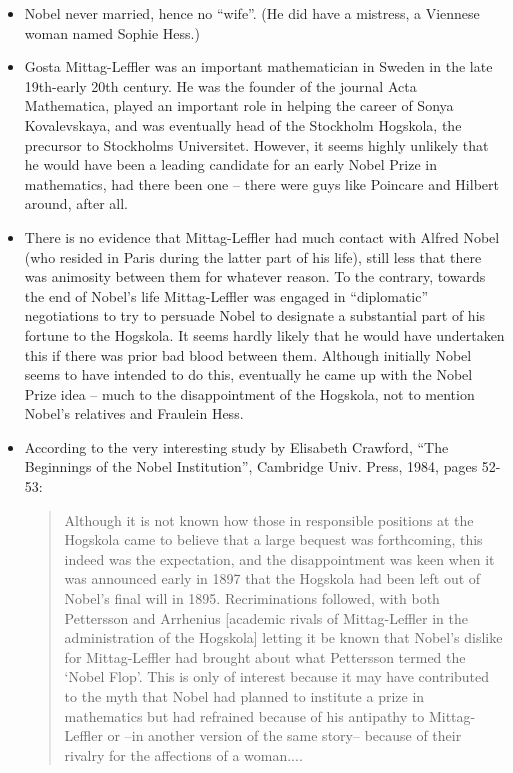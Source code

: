 \begin{itemize}
\item  Nobel never married, hence no ``wife''. (He did have a mistress,
    a Viennese woman named Sophie Hess.)
    \item  Gosta Mittag-Leffler was an important mathematician in Sweden
    in the late 19th-early 20th century.  He was the founder of the
    journal Acta Mathematica, played an important role in helping the
    career of Sonya Kovalevskaya, and was eventually head of the
    Stockholm Hogskola, the precursor to Stockholms Universitet.
    However, it seems highly unlikely that he would have been a
    leading candidate for an early Nobel Prize in mathematics, had
    there been one -- there were guys like Poincare and Hilbert around,
    after all.
    \item  There is no evidence that Mittag-Leffler had much contact with
    Alfred Nobel (who resided in Paris during the latter part of his
    life), still less that there was animosity between them for whatever
    reason.  To the contrary, towards the end of Nobel's life
    Mittag-Leffler was engaged in ``diplomatic'' negotiations to try to
    persuade Nobel to designate a substantial part of his fortune to the
    Hogskola. It seems hardly likely that he would have undertaken this
    if there was prior bad blood between them.  Although initially Nobel
    seems to have intended to do this, eventually he came up with the
    Nobel Prize idea -- much to the disappointment of the Hogskola,
    not to mention Nobel's relatives and Fraulein Hess.
    \item According to the very interesting study by Elisabeth Crawford,
    ``The Beginnings of the Nobel Institution'', Cambridge Univ. Press,
    1984, pages 52-53:
\begin{quote}
    Although it is not known how those in responsible positions
    at the Hogskola came to believe that a large bequest was forthcoming,
    this indeed was the expectation, and the disappointment was keen when
    it was announced early in 1897 that the Hogskola had been left out of
    Nobel's final will in 1895.  Recriminations followed, with both
    Pettersson and Arrhenius [academic rivals of Mittag-Leffler in the
    administration of the Hogskola] letting it be known that Nobel's
    dislike for Mittag-Leffler had brought about what Pettersson termed the
    `Nobel Flop'.  This is only of interest because it may have contributed
    to the myth that Nobel had planned to institute a prize in mathematics
    but had refrained because of his antipathy to Mittag-Leffler or
    --in another version of the same story-- because of their rivalry for
    the affections of a woman....
\end{quote}



\end{itemize}
